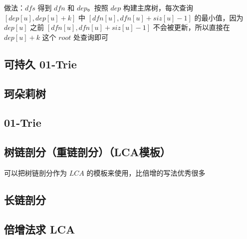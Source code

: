 \documentclass[12pt]{article}
\begin{document}
做法：$dfs$ 得到 $dfn$ 和 $dep$。按照 $dep$ 构建主席树，每次查询 $[dep[u],dep[u]+k]$ 中 $[dfn[u],dfn[u]+siz[u]-1]$ 的最小值，因为 $dep[u]$ 之前 $[dfn[u],dfn[u]+siz[u]-1]$ 不会被更新，所以直接在 $dep[u]+k$ 这个 $root$ 处查询即可



\newpage

\subsection{可持久 01-Trie}



\newpage

\subsection{珂朵莉树}



\newpage

\subsection{01-Trie}



\newpage

\subsection{树链剖分（重链剖分）（LCA模板）}

可以把树链剖分作为 $LCA$ 的模板来使用，比倍增的写法优秀很多



\subsection{长链剖分}



\newpage

\subsection{倍增法求 LCA}
\end{document}
